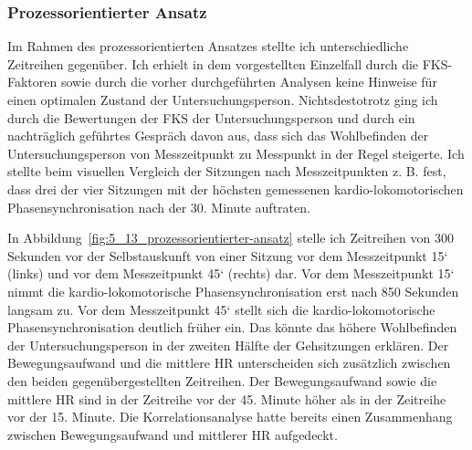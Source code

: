 \subsubsection{Prozessorientierter Ansatz}

\begin{sidewaysfigure}
	\resizebox{1.00\textwidth}{!}{%
		
		}%
	\caption[Prozessdarstellung im Verlauf des Gehens (Fallstudie: Gehen)]{Prozessdarstellung im Verlauf des Gehens -- Drei Minuten Daten aus einem Gang vor der 15 Minute (links) und einem Gang vor der 45 Minute (rechts). Quelle: Eigene Darstellung \\ \hspace{\textwidth}\emph{Anmerkung}: Bew. = Bewegungsaufwand \\ \hspace{\textwidth}Rel. Phase = Relative Phase}
	\label{fig:5_13_prozessorientierter-ansatz}
\end{sidewaysfigure}

Im Rahmen des prozessorientierten Ansatzes stellte ich unterschiedliche Zeitreihen gegenüber. Ich erhielt in dem vorgestellten Einzelfall durch die \ac{FKS}-Faktoren sowie durch die vorher durchgeführten Analysen keine Hinweise für einen optimalen Zustand der Untersuchungsperson. Nichtsdestotrotz ging ich durch die Bewertungen der \ac{FKS} der Untersuchungsperson und durch ein nachträglich geführtes Gespräch davon aus, dass sich das Wohlbefinden der Untersuchungsperson von Messzeitpunkt zu Messpunkt in der Regel steigerte. Ich stellte beim visuellen Vergleich der Sitzungen nach Messzeitpunkten z. B. fest, dass drei der vier Sitzungen mit der höchsten gemessenen kardio-lokomotorischen Phasensynchronisation nach der 30. Minute auftraten.

In Abbildung~\ref{fig:5_13_prozessorientierter-ansatz} stelle ich Zeitreihen von 300 Sekunden vor der Selbstauskunft von einer Sitzung vor dem Messzeitpunkt 15‘ (links) und vor dem Messzeitpunkt 45‘ (rechts) dar. Vor dem Messzeitpunkt 15‘ nimmt die kardio-lokomotorische Phasensynchronisation erst nach 850 Sekunden langsam zu. Vor dem Messzeitpunkt 45‘ stellt sich die kardio-lokomotorische Phasensynchronisation deutlich früher ein. Das könnte das höhere Wohlbefinden der Untersuchungsperson in der zweiten Hälfte der Gehsitzungen erklären. Der Bewegungsaufwand und die mittlere \ac{HR} unterscheiden sich zusätzlich zwischen den beiden gegenübergestellten Zeitreihen. Der Bewegungsaufwand sowie die mittlere \ac{HR} sind in der Zeitreihe vor der 45. Minute höher als in der Zeitreihe vor der 15. Minute. Die Korrelationsanalyse hatte bereits einen Zusammenhang zwischen Bewegungsaufwand und mittlerer \ac{HR} aufgedeckt.

